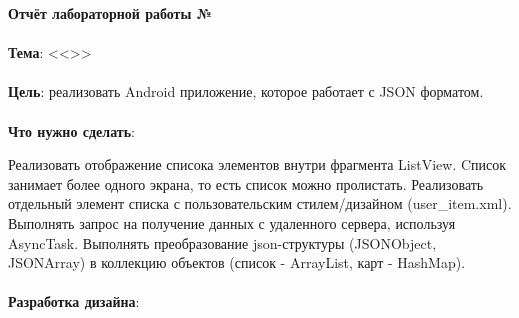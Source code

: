 \documentclass[12pt, a4paper, simple]{eskdtext}
\def \gpiDocTopic {Отчёт лабораторной работы №\gpiDocNum}
\begin{document}
    
    \begin{center}
        \textbf{\gpiDocTopic}
    \end{center}

    \paragraph{} \textbf{Тема}: <<\gpiTopicRep>>

    \paragraph{} \textbf{Цель}: реализовать Android приложение, которое работает с JSON форматом.

    \paragraph{} \textbf{Что нужно сделать}:

    Реализовать отображение списока элементов внутри фрагмента ListView.
    Cписок занимает более одного экрана, то есть список можно пролистать.
    Реализовать отдельный элемент списка с пользовательским стилем/дизайном (user\_item.xml).
    Выполнять запрос на получение данных с удаленного сервера, используя AsyncTask.
    Выполнять преобразование json-структуры (JSONObject, JSONArray) в коллекцию объектов (список - ArrayList, карт - HashMap).

    \paragraph{} \textbf{Разработка дизайна}:
\end{document}
